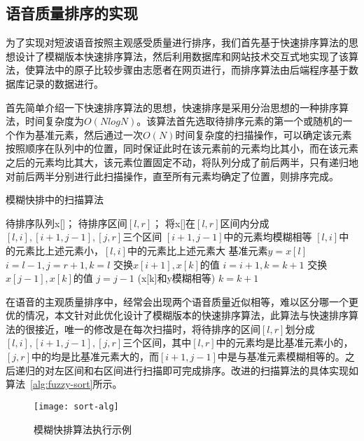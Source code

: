 \subsection{语音质量排序的实现}

为了实现对短波语音按照主观感受质量进行排序，我们首先基于快速排序算法的思想设计了模糊版本快速排序算法，然后利用数据库和网站技术交互式地实现了该算法，使算法中的原子比较步骤由志愿者在网页进行，而排序算法由后端程序基于数据库记录的数据进行。

首先简单介绍一下快速排序算法的思想，快速排序是采用分治思想的一种排序算法，时间复杂度为$O(NlogN)$。该算法首先选取待排序元素的第一个或随机的一个作为基准元素，然后通过一次$O(N)$时间复杂度的扫描操作，可以确定该元素按照顺序在队列中的位置，同时保证此时在该元素前的元素均比其小，而在该元素之后的元素均比其大，该元素位置固定不动，将队列分成了前后两半，只有递归地对前后两半分别进行此扫描操作，直至所有元素均确定了位置，则排序完成。

\begin{algorithm}
    \caption{模糊快排中的扫描算法}
    \label{alg:fuzzy-sort}
\begin{algorithmic}[1]
\INPUT
    \Statex 待排序队列x[]；
    \Statex 待排序区间$[l, r]$；
\OUTPUT
    \Statex 将x[]在$[l, r]$区间内分成$[l, i], [i+1,  j-1], [j, r]$三个区间
    \Statex $[i+1,  j-1]$中的元素均模糊相等
    \Statex $[l, i]$中的元素比上述元素小，$[l, i]$中的元素比上述元素大
\State 基准元素$y = x[l]$
\State $i=l-1, j=r+1, k=l$
        \State 交换$x[i+1], x[k]$的值
        \State $i = i + 1, k = k + 1$
        \State 交换$x[j-1], x[k]$的值
        \State $j=j-1$
    \Else
        \State (x[k]和y模糊相等) $k=k+1$ 
    \EndIf
\EndWhile
\end{algorithmic}
\end{algorithm}

在语音的主观质量排序中，经常会出现两个语音质量近似相等，难以区分哪一个更优的情况，本文针对此优化设计了模糊版本的快速排序算法，此算法与快速排序算法的很接近，唯一的修改是在每次扫描时，将待排序的区间$[l, r]$划分成$[l, i], [i+1,  j-1], [j, r]$三个区间，其中$[l, r]$中的元素均是比基准元素小的，$[j, r]$中的均是比基准元素大的，而$[i+1,  j-1]$中是与基准元素模糊相等的。之后递归的对左区间和右区间进行扫描即可完成排序。改进的扫描算法的具体实现如算法~\ref{alg:fuzzy-sort}所示。

\begin{figure}
\centering
\texttt{[image: sort-alg]}
\caption{模糊快排算法执行示例\label{fig:fuzzy-sort}}
\end{figure}

